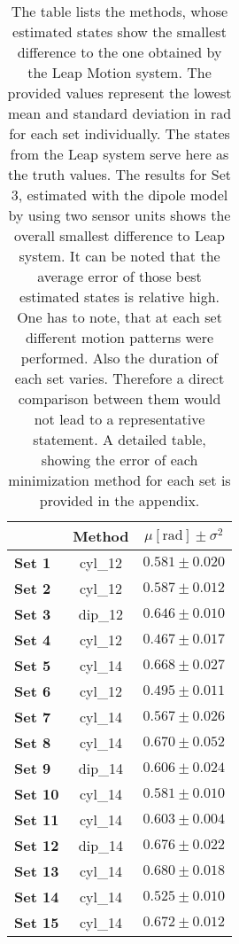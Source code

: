 \begin{table}
\centering
\begin{tabular}{l c c}
\toprule
 & Method & $ \mu [\si{\radian}] \pm \sigma^{2} $ \\ \midrule 
\textbf{Set 1}  & cyl\_12 & $ 0.581 \pm 0.020 $ \\ 
\textbf{Set 2}  & cyl\_12 & $ 0.587 \pm 0.012 $ \\ 
\textbf{Set 3}  & dip\_12 & $ 0.646 \pm 0.010 $ \\ 
\textbf{Set 4}  & cyl\_12 & $ 0.467 \pm 0.017 $ \\ 
\textbf{Set 5}  & cyl\_14 & $ 0.668 \pm 0.027 $ \\ 
\textbf{Set 6}  & cyl\_12 & $ 0.495 \pm 0.011 $ \\ 
\textbf{Set 7}  & cyl\_14 & $ 0.567 \pm 0.026 $ \\ 
\textbf{Set 8}  & cyl\_14 & $ 0.670 \pm 0.052 $ \\ 
\textbf{Set 9}  & dip\_14 & $ 0.606 \pm 0.024 $ \\ 
\textbf{Set 10} & cyl\_14 & $ 0.581 \pm 0.010 $ \\ 
\textbf{Set 11} & cyl\_14 & $ 0.603 \pm 0.004 $ \\ 
\textbf{Set 12} & dip\_14 & $ 0.676 \pm 0.022 $ \\ 
\textbf{Set 13} & cyl\_14 & $ 0.680 \pm 0.018 $ \\ 
\textbf{Set 14} & cyl\_14 & $ 0.525 \pm 0.010 $ \\ 
\textbf{Set 15} & cyl\_14 & $ 0.672 \pm 0.012 $ \\ \bottomrule
\end{tabular}
\caption[Parameters for the estimation results, showing the smallest difference to the Leap Motion]
{The table lists the methods, whose estimated states show the smallest difference to the one obtained by the Leap Motion system. The provided values represent the lowest mean and standard deviation in \si{\radian} for each set individually. The states from the Leap system serve here as the truth values. The results for Set 3, estimated with the dipole model by using two sensor units shows the overall smallest difference to Leap system. It can be noted that the average error of those best estimated states is relative high. One has to note, that at each set different motion patterns were performed. Also the duration of each set varies. Therefore a direct comparison between them would not lead to a representative statement. A detailed table, showing the error of each minimization method for each set is provided in the appendix.}
\label{tab:estSet}
\end{table}
